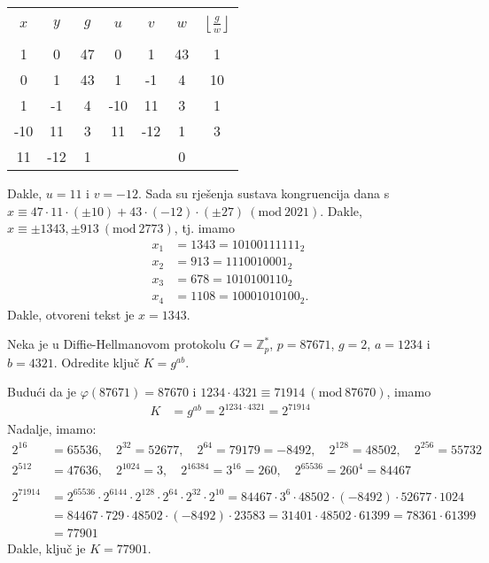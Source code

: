 \documentclass{exam}
\newcommand{\Mod}[1]{\ (\mathrm{mod}\ #1)}
\begin{document}
\begin{questions}
\begin{solution}
  \begin{tabular}{|c|c|c|c|c|c|c|}
    \hline
    & & & & & &\\[-1em]
    $x$ & $y$ & $g$ & $u$ & $v$ & $w$ & $\left\lfloor \frac{g}{w} \right\rfloor$\\
    & & & & & &\\[-1em]
    \hline
    1 & 0 & 47 & 0 & 1 & 43 & 1\\
    0 & 1 & 43 & 1 & -1 & 4 & 10\\
    1 & -1 & 4 & -10 & 11 & 3 & 1\\
    -10 & 11 & 3 & 11 & -12 & 1 & 3\\
    11 & -12 & 1 & & & 0 &\\
    \hline
  \end{tabular}

  Dakle, $u = 11$ i $v = -12$. Sada su rješenja sustava kongruencija dana s $x \equiv 47 \cdot 11 \cdot (\pm 10) + 43 \cdot (-12) \cdot (\pm 27) \Mod{2021}$. Dakle, $x \equiv \pm 1343, \pm 913 \Mod{2773}$, tj. imamo
  \begin{align*}
    x_1 &= 1343 = 10100111111_2\\
    x_2 &= 913 = 1110010001_2\\
    x_3 &= 678 = 1010100110_2\\
    x_4 &= 1108 = 10001010100_2.
  \end{align*}
  Dakle, otvoreni tekst je $x = 1343$.
\end{solution}

\question Neka je u Diffie-Hellmanovom protokolu $G = \mathbb{Z}_p^*$, $p = 87671$, $g = 2$, $a = 1234$ i $b = 4321$. Odredite ključ $K = g^{ab}$.

\begin{solution}
  Budući da je $\varphi(87671) = 87670$ i $1234 \cdot 4321 \equiv 71914 \Mod{87670}$, imamo
  \begin{align*}
    K &= g^{a b} = 2^{1234 \cdot 4321} = 2^{71914}
  \end{align*}
  Nadalje, imamo:
  \begin{align*}
    2^{16} &= 65536, \quad 2^{32} = 52677, \quad 2^{64} = 79179 = -8492, \quad 2^{128} = 48502, \quad 2^{256} = 55732\\
    2^{512} &= 47636, \quad 2^{1024} = 3, \quad 2^{16384} = 3^{16} = 260, \quad 2^{65536} = 260^{4} = 84467\\\\
    2^{71914} &= 2^{65536} \cdot 2^{6144} \cdot 2^{128} \cdot 2^{64} \cdot 2^{32} \cdot 2^{10} = 84467 \cdot 3^6 \cdot 48502 \cdot (-8492) \cdot 52677 \cdot 1024\\
    &= 84467 \cdot 729 \cdot 48502 \cdot (-8492) \cdot 23583 = 31401 \cdot 48502 \cdot 61399 = 78361 \cdot 61399\\
    &= 77901
  \end{align*}
  Dakle, ključ je $K = 77901$.
\end{solution}


\end{questions}
\end{document}
